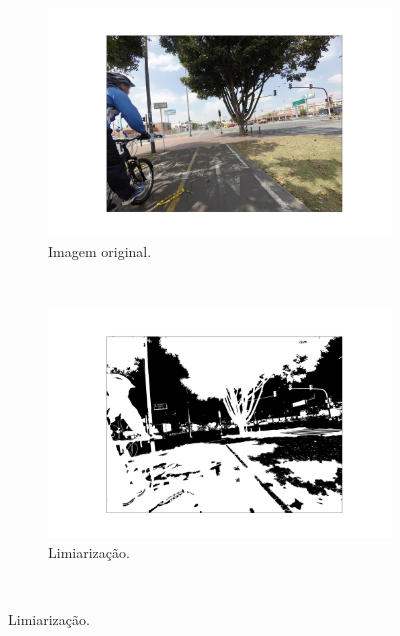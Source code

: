 \begin{figure}[H]
   \caption{Processo de segmentação \textit{watershed}.}
   \centering
   \label{segment:fig:watershed_2}
    \begin{subfigure}[t]{0.45\textwidth}
        \centering
        \includegraphics[width=1\linewidth]{recursos/imagens/image_seg/watershed0.jpg}
        \caption{Imagem original.}
        \label{segment:fig:watershed_2.1}
    \end{subfigure}%
    ~ 
    \begin{subfigure}[t]{0.45\textwidth}
        \centering
        \includegraphics[width=1\linewidth]{recursos/imagens/image_seg/watershed1.jpg}
        \caption{Limiarização.}
        \label{segment:fig:watershed_2.2}
    \end{subfigure}%
    ~ 
    

\end{figure}
